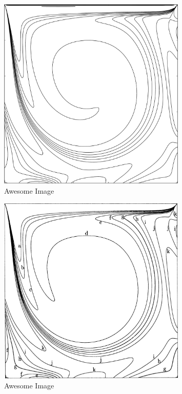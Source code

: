 \begin{figure}[p]
    \centering
    \includegraphics[width=0.8\textwidth]{Images/vorticity.pdf}
    \caption{Awesome Image}
    \label{fig:awesome_image}
\end{figure}

\begin{figure}[p]
    \centering
    \includegraphics[width=0.8\textwidth]{Images/vorticity.png}
    \caption{Awesome Image}
    \label{fig:awesome_image}
\end{figure}

